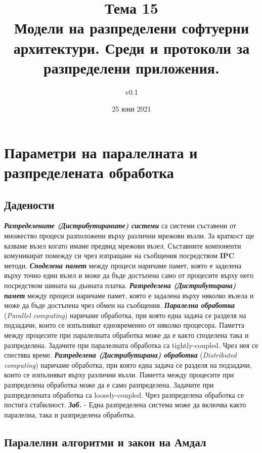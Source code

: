 \documentclass[fleqn,12pt]{article}
\title{Тема 15\\ Модели на разпределени софтуерни архитектури. Среди и протоколи за разпределени приложения.}
\author{v0.1}
\date{25 юни 2021}
\begin{document}
\maketitle
\tableofcontents
\pagebreak

\section{Параметри на паралелната и разпределената обработка}

\subsection{Дадености}

\textbf{\textit{Разпределените (Дистрибутираните) системи}} са системи съставени от множество процеси разположени върху различни мрежови възли.
За краткост ще казваме възел когато имаме предвид мрежови възел.
Съставните компоненти комуникират помежду си чрез изпращане на съобщения посредством \textbf{IPC} методи.
\bigbreak
\textbf{\textit{Споделена памет}} между процеси наричаме памет, която е заделена върху точно един възел и може да бъде достъпена само от процесите върху него посредством шината на дънната платка.
\bigbreak
\textbf{\textit{Разпределена (Дистрибутирана) памет}} между процеси наричаме памет, която е задалена върху няколко възела и може да бъде достъпена чрез обмен на съобщения.
\bigbreak
\textbf{\textit{Паралелна обработка}} (\textit{Parallel computing}) наричаме обработка, при която една задача се разделя на подзадачи, които се изпълняват едновременно от няколко процесора.
Паметта между процесите при паралелната обработка може да е както споделена така и разпределена.
Задачите при паралелната обработка са tightly-coupled.
Чрез нея се спестява време.
\bigbreak
\textbf{\textit{Разпределена (Дистрибутирана) обработка}} (\textit{Distributed computing}) наричаме обработка, при която една задача се разделя на подзадачи, които се изпълняват върху различни възли.
Паметта между процесите при разпределена обработка може да е само разпределена.
Задачите при разпределената обработка са loosely-coupled.
Чрез разпределена обработка се постига стабилност.
\bigbreak
\textbf{\textit{Заб.}} - Една разпределена система може да включва както паралелна, така и разпределена обработка.

\subsection{Паралелни алгоритми и закон на Амдал}
\end{document}
